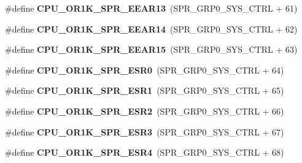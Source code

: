 \begin{DoxyCompactItemize}
\item 
\mbox{\label{or1k-utility_8h_a15810f40160a17a1ad497a64ff1a4bbb}} 
\#define {\bfseries C\+P\+U\+\_\+\+O\+R1\+K\+\_\+\+S\+P\+R\+\_\+\+E\+E\+A\+R13}~(S\+P\+R\+\_\+\+G\+R\+P0\+\_\+\+S\+Y\+S\+\_\+\+C\+T\+RL + 61)
\item 
\mbox{\label{or1k-utility_8h_a8231129f7411050f36d17ddd475795fc}} 
\#define {\bfseries C\+P\+U\+\_\+\+O\+R1\+K\+\_\+\+S\+P\+R\+\_\+\+E\+E\+A\+R14}~(S\+P\+R\+\_\+\+G\+R\+P0\+\_\+\+S\+Y\+S\+\_\+\+C\+T\+RL + 62)
\item 
\mbox{\label{or1k-utility_8h_a629b01bae8474867b9666e51f551aaf2}} 
\#define {\bfseries C\+P\+U\+\_\+\+O\+R1\+K\+\_\+\+S\+P\+R\+\_\+\+E\+E\+A\+R15}~(S\+P\+R\+\_\+\+G\+R\+P0\+\_\+\+S\+Y\+S\+\_\+\+C\+T\+RL + 63)
\item 
\mbox{\label{or1k-utility_8h_ae136864e02dfe8bdcf95f87b22828ab1}} 
\#define {\bfseries C\+P\+U\+\_\+\+O\+R1\+K\+\_\+\+S\+P\+R\+\_\+\+E\+S\+R0}~(S\+P\+R\+\_\+\+G\+R\+P0\+\_\+\+S\+Y\+S\+\_\+\+C\+T\+RL + 64)
\item 
\mbox{\label{or1k-utility_8h_a4464801b79ed7e869f894983e7913dc0}} 
\#define {\bfseries C\+P\+U\+\_\+\+O\+R1\+K\+\_\+\+S\+P\+R\+\_\+\+E\+S\+R1}~(S\+P\+R\+\_\+\+G\+R\+P0\+\_\+\+S\+Y\+S\+\_\+\+C\+T\+RL + 65)
\item 
\mbox{\label{or1k-utility_8h_a569455c3358a1d09f96535086ef9dac7}} 
\#define {\bfseries C\+P\+U\+\_\+\+O\+R1\+K\+\_\+\+S\+P\+R\+\_\+\+E\+S\+R2}~(S\+P\+R\+\_\+\+G\+R\+P0\+\_\+\+S\+Y\+S\+\_\+\+C\+T\+RL + 66)
\item 
\mbox{\label{or1k-utility_8h_a05e8766e868fd25cd847cb998045c40f}} 
\#define {\bfseries C\+P\+U\+\_\+\+O\+R1\+K\+\_\+\+S\+P\+R\+\_\+\+E\+S\+R3}~(S\+P\+R\+\_\+\+G\+R\+P0\+\_\+\+S\+Y\+S\+\_\+\+C\+T\+RL + 67)
\item 
\mbox{\label{or1k-utility_8h_a598ee0ad600ce3fe9f4f17d412f0961c}} 
\#define {\bfseries C\+P\+U\+\_\+\+O\+R1\+K\+\_\+\+S\+P\+R\+\_\+\+E\+S\+R4}~(S\+P\+R\+\_\+\+G\+R\+P0\+\_\+\+S\+Y\+S\+\_\+\+C\+T\+RL + 68)
\item 
\mbox{\label{or1k-utility_8h_a9671b8bc71a6254c284e1b56103dcaa1}} 

\end{DoxyCompactItemize}
